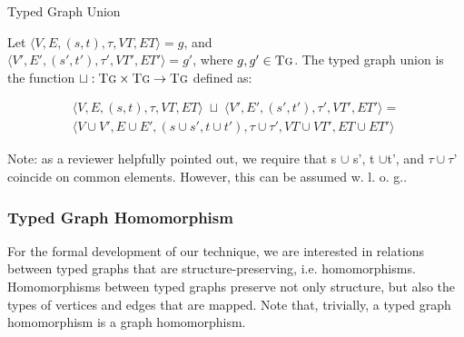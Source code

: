 \begin{definition}{Typed Graph Union\\}
\label{def:typed_graph_union}

Let $\langle V,E,(s,t),\tau,VT,ET\rangle = g$, and\\ $\langle V',E',(s',t'),\tau',VT',ET'\rangle = g'$, where $g, g' \in \textsc{Tg}$.%
The typed graph union is the function $\sqcup :\textsc{Tg}\times \textsc{Tg}\rightarrow \textsc{Tg}$ defined as:

\begin{multline*}
\big\langle V,E,(s,t),\tau,VT,ET\big\rangle\;\sqcup\;\big\langle V',E',(s',t'),\tau',VT',ET'\big\rangle=\\\big\langle V\cup V', E\cup
E',(s\cup s', t\cup t'), \tau\cup \tau', VT\cup VT', ET\cup ET'\big\rangle
\end{multline*}
\end{definition}

Note: as a reviewer helpfully pointed out, we require that s $\cup$ s', t $\cup$t', and $\tau \cup \tau$' coincide on common elements. However, this can be assumed w. l. o. g..

\subsubsection*{Typed Graph Homomorphism}
For the formal development of our technique, we are interested in relations between typed graphs that are structure-preserving, i.e. homomorphisms. Homomorphisms between typed graphs preserve not only structure, but also the types of vertices and edges that are mapped. Note that, trivially, a typed graph homomorphism is a graph homomorphism.


